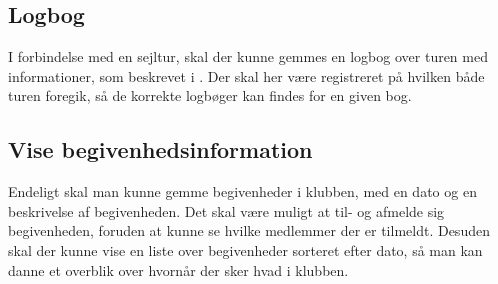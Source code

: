 \subsection{Logbog}

I forbindelse med en sejltur, skal der kunne gemmes en logbog over turen med informationer, som beskrevet i .
Der skal her være registreret på hvilken både turen foregik, så de korrekte logbøger kan findes for en given bog.

\subsection{Vise begivenhedsinformation}

Endeligt skal man kunne gemme begivenheder i klubben, med en dato og en beskrivelse af begivenheden. 
Det skal være muligt at til- og afmelde sig begivenheden, foruden at kunne se hvilke medlemmer der er tilmeldt.
Desuden skal der kunne vise en liste over begivenheder sorteret efter dato, så man kan danne et overblik over hvornår der sker hvad i klubben.
